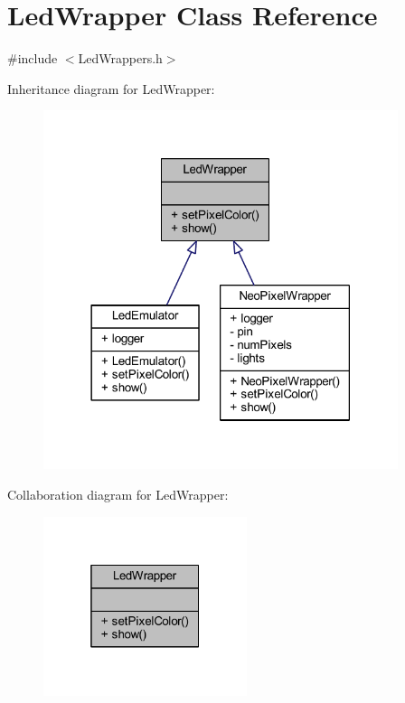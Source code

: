 \hypertarget{class_led_wrapper}{}\section{Led\+Wrapper Class Reference}
\label{class_led_wrapper}


{\ttfamily \#include $<$Led\+Wrappers.\+h$>$}



Inheritance diagram for Led\+Wrapper\+:
\nopagebreak
\begin{figure}[H]
\begin{center}
\leavevmode
\includegraphics[width=294pt]{class_led_wrapper__inherit__graph}
\end{center}
\end{figure}


Collaboration diagram for Led\+Wrapper\+:
\nopagebreak
\begin{figure}[H]
\begin{center}
\leavevmode
\includegraphics[width=169pt]{class_led_wrapper__coll__graph}
\end{center}
\end{figure}
